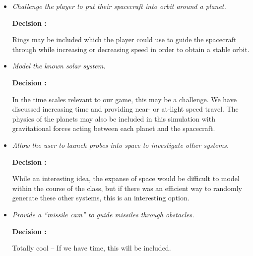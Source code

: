 \begin{itemize}
  \item \emph{Challenge the player to put their spacecraft into orbit around a planet.}
        
        \textbf{Decision : } \parbox[t]{5in}{Rings may be included which the player could use to guide the spacecraft through while increasing or decreasing speed in order to obtain a stable orbit.}

  \item \emph{Model the known solar system.}
        
        \textbf{Decision : } \parbox[t]{5in}{In the time scales relevant to our game, this may be a challenge.  We have discussed increasing time and providing near- or at-light speed travel.  The physics of the planets may also be included in this simulation with gravitational forces acting between each planet and the spacecraft.}

  \item \emph{Allow the user to launch probes into space to investigate other systems.}
        
        \textbf{Decision : } \parbox[t]{5in}{While an interesting idea, the expanse of space would be difficult to model within the course of the class, but if there was an efficient way to randomly generate these other systems, this is an interesting option.}

  \item \emph{Provide a ``missile cam'' to guide missiles through obstacles.}
        
        \textbf{Decision : } \parbox[t]{5in}{Totally cool -- If we have time, this will be included.}

\end{itemize}




